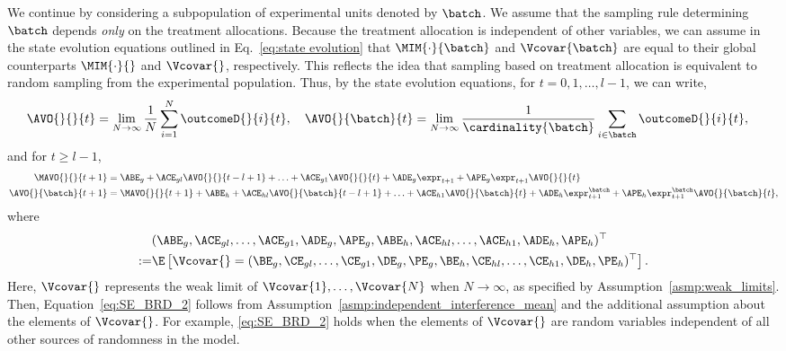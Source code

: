 We continue by considering a subpopulation of experimental units denoted by $\batch$. We assume that the sampling rule determining $\batch$ depends \emph{only} on the treatment allocations. Because the treatment allocation is independent of other variables, we can assume in the state evolution equations outlined in Eq.~\eqref{eq:state evolution} that $\MIM{\cdot}{\batch}$ and $\Vcovar{\batch}$ are equal to their global counterparts $\MIM{\cdot}{}$ and $\Vcovar{}$, respectively. This reflects the idea that sampling based on treatment allocation is equivalent to random sampling from the experimental population. Thus, by the state evolution equations, for $t = 0, 1, \ldots, l-1$, we can write,
% 
\begin{equation}
    \label{eq:SE_BRD_1}
    \begin{aligned}
        \AVO{}{}{t}
        &=
        \lim_{N \rightarrow \infty}
        \frac{1}{N}
        \sum_{i=1}^N
        \outcomeD{}{i}{t},
        \quad
        \AVO{}{\batch}{t}
        =
        \lim_{N \rightarrow \infty}
        \frac{1}{\cardinality{\batch}}
        \sum_{i \in \batch}
        \outcomeD{}{i}{t},
    \end{aligned}
\end{equation}
% 
and for $t \geq l-1$,
% 
\begin{equation}
    \label{eq:SE_BRD_2}
    \begin{aligned}
        \MAVO{}{}{t+1}
        &=
        \ABE_{g} +
        \ACE_{gl} \AVO{}{}{t-l+1} + \ldots + \ACE_{g1} \AVO{}{}{t} +  
        \ADE_g \expr_{t+1} +
        \APE_g \expr_{t+1} \AVO{}{}{t}
        \\
        \AVO{}{\batch}{t+1}
        &=
        \MAVO{}{}{t+1} +
        \ABE_{h} +
        \ACE_{hl} \AVO{}{\batch}{t-l+1} + \ldots + \ACE_{h1} \AVO{}{\batch}{t} +  
        \ADE_h \expr_{t+1}^\batch +
        \APE_h \expr_{t+1}^\batch \AVO{}{\batch}{t},
    \end{aligned}
\end{equation}
% 
where
% 
\begin{equation}
\label{eq:apndx_BRD_parameters_mean}
\begin{aligned}
    &(\ABE_{g}, \ACE_{gl}, \ldots, \ACE_{g1}, \ADE_g, \APE_g, \ABE_{h}, \ACE_{hl}, \ldots, \ACE_{h1}, \ADE_h, \APE_h)^\top
    \\
    :=
    &\E \left[ 
    \Vcovar{} =
    (\BE_{g}, \CE_{gl}, \ldots, \CE_{g1}, \DE_g, \PE_g, \BE_{h}, \CE_{hl}, \ldots, \CE_{h1}, \DE_h, \PE_h)^\top
    \right].
\end{aligned}
\end{equation}
% 
Here, $\Vcovar{}$ represents the weak limit of $\Vcovar{1}, \ldots, \Vcovar{N}$ when $N \rightarrow \infty$, as specified by Assumption~\ref{asmp:weak_limits}. Then, Equation~\eqref{eq:SE_BRD_2} follows from Assumption~\ref{asmp:independent_interference_mean} and the additional assumption about the elements of $\Vcovar{}$. For example, \eqref{eq:SE_BRD_2} holds when the elements of $\Vcovar{}$ are random variables independent of all other sources of randomness in the model.

